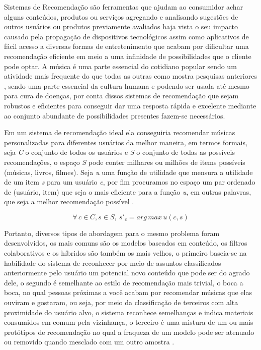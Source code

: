 \documentclass[12pt, %
openright, 
oneside, %
a4paper,    %
brazil]{facom-ufu-abntex2}
\begin{document}
Sistemas de Recomendação são ferramentas que ajudam ao consumidor achar alguns conteúdos, produtos ou serviços agregando e analisando sugestões de outros usuários ou produtos previamente avaliados \cite{park2012literature}  haja vista o seu impacto causado pela propagação de dispositivos tecnológicos assim como aplicativos de fácil acesso a diversas formas de entretenimento que acabam por dificultar uma recomendação eficiente em meio a uma infinidade de possibilidades que o cliente pode optar.
A música é uma parte essencial do cotidiano popular sendo um atividade mais frequente do que todas as outras como mostra  pesquisas anteriores \cite{song2012survey}, sendo uma parte essencial da cultura humana e podendo ser usada até mesmo para cura de doenças, por conta dissos sistemas de recomendação que sejam robustos e eficientes para conseguir dar uma resposta rápida e excelente mediante ao conjunto abundante de possibilidades presentes fazem-se necessários.

Em um sistema de recomendação ideal ela conseguiria recomendar músicas personalizadas para diferentes usuários da melhor maneira, em termos formais, seja \textit{C} o conjunto de todos os usuários e \textit{S} o conjunto de todas as possíveis recomendações, o espaço \textit{S} pode conter milhares ou milhões de items possíveis (músicas, livros, filmes). Seja \textit{u} uma função de utilidade que mensura a utilidade de um item \textit{s} para um usuário \textit{c}, por fim procuramos no espaço um par ordenado de (usuário, item) que seja o mais eficiente para a função \textit{u}, em outras palavras, que seja a melhor recomendação possível \cite{adomavicius2005toward}.

\begin{equation}
  \forall \, c \in C, \textit{s} \in \textit{S},  \ s'_{c} = arg \, max \, u(c,s)
\end{equation}


Portanto, diversos tipos de abordagem para o mesmo problema foram desenvolvidos, os mais comuns são os modelos baseados em conteúdo, os filtros colaborativos e os híbridos são também os mais velhos, o primeiro baseia-se na habilidade do sistema de reconhecer por meio de assuntos classificados anteriormente pelo usuário um potencial novo conteúdo que pode ser do agrado dele, o segundo é semelhante ao estilo de recomendação mais trivial, o boca a boca, no qual pessoas próximas a você acabam por recomendar músicas que elas ouviram e gostaram, ou seja, por meio da classificação de terceiros com alta proximidade do usuário alvo, o sistema reconhece semelhanças e indica materiais consumidos em comum pela vizinhança, o terceiro é uma mistura de um ou mais protótipos de recomendação no qual a fraqueza de um modelo pode ser atenuado ou removido quando mesclado com um outro amostra \cite{adomavicius2005toward}.
\end{document}

